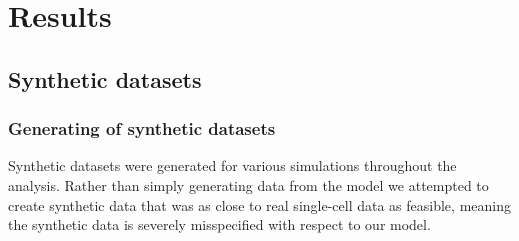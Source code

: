 \section{Results}


\subsection{Synthetic datasets}

\subsubsection{Generating of synthetic datasets}

Synthetic datasets were generated for various simulations throughout the analysis. Rather than simply generating data from the model we attempted to create synthetic data that was as close to real single-cell data as feasible, meaning the synthetic data is severely misspecified with respect to our model. 




